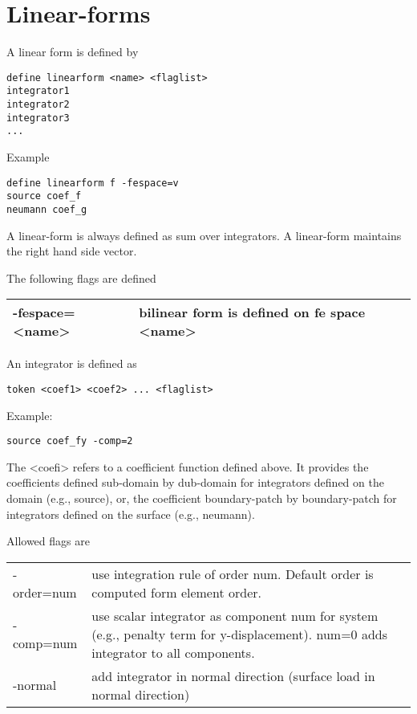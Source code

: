 \documentclass[12pt]{book}
\begin{document}
\section{Linear-forms}

A linear form is defined by
\begin{verbatim}
define linearform <name> <flaglist>
integrator1
integrator2
integrator3
...
\end{verbatim}
Example
\begin{verbatim}
define linearform f -fespace=v
source coef_f
neumann coef_g
\end{verbatim}

A linear-form is always defined as sum over integrators. A linear-form 
maintains the right hand side vector.

The following flags are defined \newline
\begin{tabular}{|l|l|}
\hline
-fespace=<name> & bilinear form is defined on fe space <name> \\
\hline
\end{tabular}

An integrator is defined as
\begin{verbatim}
token <coef1> <coef2> ... <flaglist>
\end{verbatim}
Example:
\begin{verbatim}
source coef_fy -comp=2
\end{verbatim}
The <coefi> refers to a coefficient function defined above. It
provides the coefficients defined sub-domain by dub-domain for
integrators defined on the domain (e.g., source), or, the coefficient
boundary-patch by boundary-patch for integrators defined on the
surface (e.g., neumann).

Allowed flags are \newline
\begin{tabular}{|l|l|}
\hline
-order=num & use integration rule of order num. Default order is computed form element order. \\
-comp=num & use scalar integrator as component num for system (e.g., penalty term for y-displacement). num=0 adds integrator to all components. \\
-normal   & add integrator in normal direction (surface load in normal direction) \\
\hline
\end{tabular}
\end{document}
